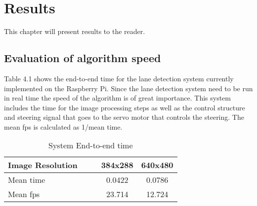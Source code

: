 \chapter{Results}
\label{sec:results}

This chapter will present results to the reader.


\section{Evaluation of algorithm speed}


Table 4.1 shows the end-to-end time for the lane detection system currently implemented on the Raspberry Pi. Since the lane detection system need to be run in real time the speed of the algorithm is of great importance. This system includes the time for the image processing steps as well as the control structure and steering signal that goes to the servo motor that controls the steering. The mean fps is calculated as 1/mean time.


\begin{table}[H]
\centering
\caption{System End-to-end time}
\label{End-to-end time}
\begin{tabular}{@{} l *4c @{}}
\toprule
Image Resolution   & & & 384x288 & 640x480  \\ 
\midrule
 Mean time & & & 0.0422 & 0.0786 \\ 
 Mean fps & & & 23.714 & 12.724 \\
\bottomrule
 \end{tabular}
\end{table}
